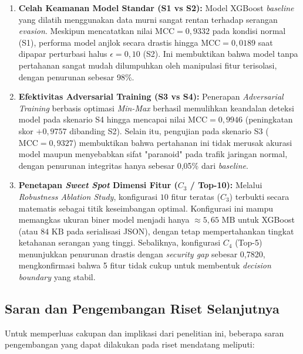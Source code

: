 \documentclass[11pt, a4paper]{article}
\begin{document}
\begin{enumerate}
    \item \textbf{Celah Keamanan Model Standar (S1 vs S2):} Model XGBoost \textit{baseline} yang dilatih menggunakan data murni sangat rentan terhadap serangan \textit{evasion}. Meskipun mencatatkan nilai $\text{MCC} = 0{,}9332$ pada kondisi normal (S1), performa model anjlok secara drastis hingga $\text{MCC} = 0{,}0189$ saat dipapar perturbasi halus $\epsilon = 0{,}10$ (S2). Ini membuktikan bahwa model tanpa pertahanan sangat mudah dilumpuhkan oleh manipulasi fitur terisolasi, dengan penurunan sebesar 98\%.

    \item \textbf{Efektivitas Adversarial Training (S3 vs S4):} Penerapan \textit{Adversarial Training} berbasis optimasi \textit{Min-Max} berhasil memulihkan keandalan deteksi model pada skenario S4 hingga mencapai nilai $\text{MCC} = 0{,}9946$ (peningkatan skor $+0{,}9757$ dibanding S2). Selain itu, pengujian pada skenario S3 ($\text{MCC} = 0{,}9327$) membuktikan bahwa pertahanan ini tidak merusak akurasi model maupun menyebabkan sifat "paranoid" pada trafik jaringan normal, dengan penurunan integritas hanya sebesar 0,05\% dari \textit{baseline}.

    \item \textbf{Penetapan \textit{Sweet Spot} Dimensi Fitur ($C_3$ / Top-10):} Melalui \textit{Robustness Ablation Study}, konfigurasi $10$ fitur teratas ($C_3$) terbukti secara matematis sebagai titik keseimbangan optimal. Konfigurasi ini mampu memangkas ukuran biner model menjadi hanya $\approx 5{,}65\text{ MB}$ untuk XGBoost (atau $84\text{ KB}$ pada serialisasi JSON), dengan tetap mempertahankan tingkat ketahanan serangan yang tinggi. Sebaliknya, konfigurasi $C_4$ (Top-5) menunjukkan penurunan drastis dengan \textit{security gap} sebesar 0,7820, mengkonfirmasi bahwa 5 fitur tidak cukup untuk membentuk \textit{decision boundary} yang stabil.
\end{enumerate}

\subsection{Saran dan Pengembangan Riset Selanjutnya}
Untuk memperluas cakupan dan implikasi dari penelitian ini, beberapa saran pengembangan yang dapat dilakukan pada riset mendatang meliputi:
\end{document}
